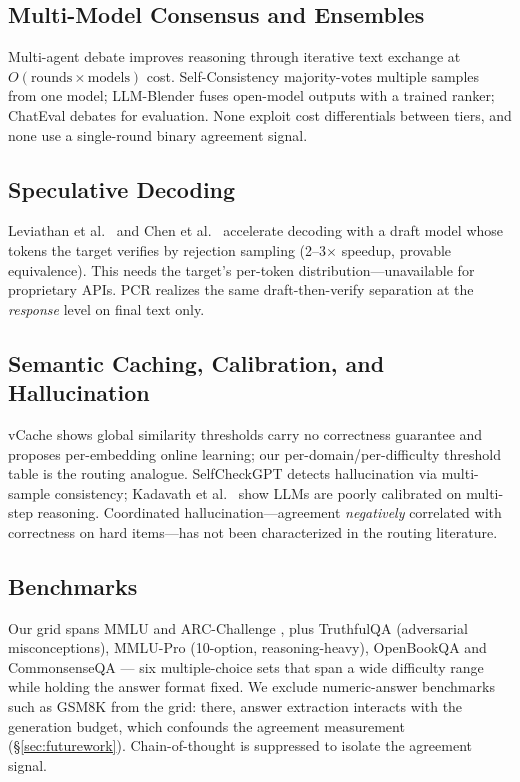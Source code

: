 \documentclass[conference]{IEEEtran}
\begin{document}
\subsection{Multi-Model Consensus and Ensembles}
Multi-agent debate \cite{du2023multiagent} improves reasoning through iterative
text exchange at $O(\text{rounds}\times\text{models})$ cost. Self-Consistency
\cite{wang2023selfconsistency} majority-votes multiple samples from one model;
LLM-Blender \cite{jiang2023llmblender} fuses open-model outputs with a trained
ranker; ChatEval \cite{chan2023chateval} debates for evaluation. None exploit
cost differentials between tiers, and none use a single-round binary agreement
signal.

\subsection{Speculative Decoding}
Leviathan et al.\ \cite{leviathan2023} and Chen et al.\
\cite{chen2023speculative} accelerate decoding with a draft model whose tokens
the target verifies by rejection sampling (2--3$\times$ speedup, provable
equivalence). This needs the target's per-token distribution---unavailable for
proprietary APIs. PCR realizes the same draft-then-verify separation at the
\textit{response} level on final text only.

\subsection{Semantic Caching, Calibration, and Hallucination}
vCache \cite{schroeder2025vcache} shows global similarity thresholds carry no
correctness guarantee and proposes per-embedding online learning; our
per-domain/per-difficulty threshold table is the routing analogue.
SelfCheckGPT \cite{manakul2023selfcheckgpt} detects hallucination via
multi-sample consistency; Kadavath et al.\ \cite{kadavath2022} show LLMs are
poorly calibrated on multi-step reasoning. Coordinated hallucination---agreement
\textit{negatively} correlated with correctness on hard items---has not been
characterized in the routing literature.

\subsection{Benchmarks}
Our grid spans MMLU \cite{hendrycks2020mmlu} and ARC-Challenge
\cite{clark2018arc}, plus TruthfulQA \cite{lin2022truthfulqa} (adversarial
misconceptions), MMLU-Pro \cite{wang2024mmlupro} (10-option, reasoning-heavy),
OpenBookQA \cite{mihaylov2018openbookqa} and CommonsenseQA \cite{talmor2019csqa}
--- six multiple-choice sets that span a wide difficulty range while holding the
answer format fixed. We exclude numeric-answer benchmarks such as GSM8K
\cite{cobbe2021gsm8k} from the grid: there, answer extraction interacts with the
generation budget, which confounds the agreement measurement
(\S\ref{sec:futurework}). Chain-of-thought \cite{wei2022cot} is suppressed to
isolate the agreement signal.
\end{document}
